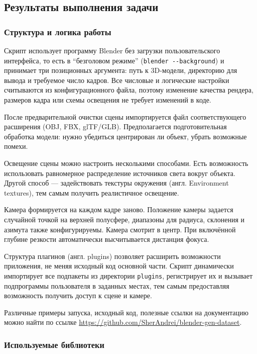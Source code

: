 \subsection{Результаты выполнения задачи}

\subsubsection*{Структура и логика работы}

Скрипт использует программу Blender без загрузки пользовательского интерфейса, то
есть в ``безголовом режиме'' (\texttt{blender -{}-background}) и принимает три
позиционных аргумента: путь к 3D-модели, директорию для вывода и требуемое число
кадров. Все числовые и логические настройки считываются из конфигурационного
файла, поэтому изменение качества рендера, размеров кадра или схемы освещения не
требует изменений в коде.

После предварительной очистки сцены импортируется файл соответствующего
расширения (OBJ, FBX, glTF/GLB). Предполагается подготовительная обработка
модели: нужно убедиться центрирован ли объект, убрать возможные помехи.

Освещение сцены можно настроить несколькими способами. Есть возможность использовать
равномерное распределение источников света вокруг объекта. Другой способ — задействовать
текстуры окружения (англ. Environment textures), тем самым получить реалистичное освещение.

Камера формируется на каждом кадре заново. Положение камеры задается случайной
точкой на верхней полусфере, диапазоны для радиуса, склонения и азимута также
конфигурируемы. Камера смотрит в центр. При включённой глубине резкости
автоматически высчитывается дистанция фокуса.

Структура плагинов (англ. plugins) позволяет расширить возможности приложения,
не меняя исходный код основной части. Скрипт динамически импортирует все подпакеты
из директории \texttt{plugins}, регистрирует их и вызывает подпрограммы пользователя
в заданных местах, тем самым предоставляя возможность получить доступ к сцене и камере.

Различные примеры запуска, исходный код, полезные ссылки на документацию можно найти
по ссылке \url{https://github.com/SherAndrei/blender-gen-dataset}.

\subsubsection*{Используемые библиотеки}

